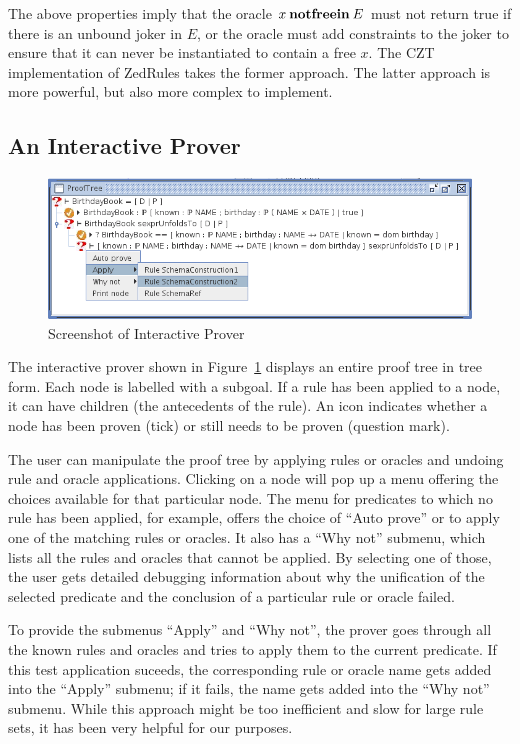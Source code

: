 \documentclass{entcs}
\begin{document}
The above properties imply that the oracle $x \mathbin{\mathop{\mathstrut{\mbox{\textbf{notfreein}}}}\nolimits} E$ must not
return true if there is an unbound joker in $E$, or the oracle must
add constraints to the joker to ensure that it can never be
instantiated to contain a free $x$.  The CZT implementation of
ZedRules takes the former approach.  The latter approach is more
powerful, but also more complex to implement.


\subsection{An Interactive Prover}

\begin{figure}[htbp]
  \centering
  \includegraphics[width=\textwidth]{cztprover1}
  \caption{Screenshot of Interactive Prover}
  \label{fig:cztprover}
\end{figure}

The interactive prover shown in Figure~\ref{fig:cztprover} displays an
entire proof tree in tree form.  Each node is labelled with a subgoal.
If a rule has been applied to a node, it can have children (the
antecedents of the rule).  An icon indicates whether a node has been
proven (tick) or still needs to be proven (question mark).

The user can manipulate the proof tree by applying rules or oracles
and undoing rule and oracle applications.  Clicking on a node will pop
up a menu offering the choices available for that particular node.
The menu for predicates to which no rule has been applied, for
example, offers the choice of ``Auto prove'' or to apply one of the
matching rules or oracles.  It also has a ``Why not'' submenu, which
lists all the rules and oracles that cannot be applied.  By selecting
one of those, the user gets detailed debugging information about why
the unification of the selected predicate and the conclusion of a
particular rule or oracle failed.

To provide the submenus ``Apply'' and ``Why not'', the prover goes
through all the known rules and oracles and tries to apply them to the
current predicate.  If this test application suceeds, the
corresponding rule or oracle name gets added into the ``Apply''
submenu; if it fails, the name gets added into the ``Why not''
submenu.  While this approach might be too inefficient and slow for
large rule sets, it has been very helpful for our purposes.
\end{document}
